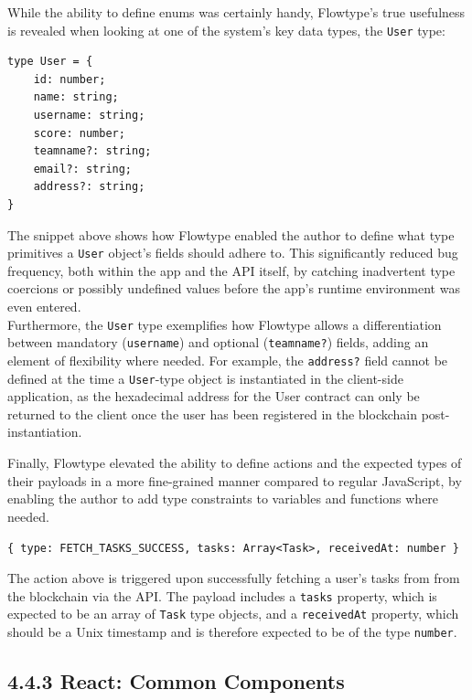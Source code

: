 While the ability to define enums was certainly handy, Flowtype's true
usefulness is revealed when looking at one of the system's key data
types, the \texttt{User} type:

\begin{verbatim}
type User = {
    id: number;
    name: string;
    username: string;
    score: number;
    teamname?: string;
    email?: string;
    address?: string;
}
\end{verbatim}

The snippet above shows how Flowtype enabled the author to define what
type primitives a \texttt{User} object's fields should adhere to. This
significantly reduced bug frequency, both within the app and the API
itself, by catching inadvertent type coercions or possibly undefined
values before the app's runtime environment was even entered.\\
Furthermore, the \texttt{User} type exemplifies how Flowtype allows a
differentiation between mandatory (\texttt{username}) and optional
(\texttt{teamname?}) fields, adding an element of flexibility where
needed. For example, the \texttt{address?} field cannot be defined at
the time a \texttt{User}-type object is instantiated in the client-side
application, as the hexadecimal address for the User contract can only
be returned to the client once the user has been registered in the
blockchain post-instantiation.

Finally, Flowtype elevated the ability to define actions and the
expected types of their payloads in a more fine-grained manner compared
to regular JavaScript, by enabling the author to add type constraints to
variables and functions where needed.

\texttt{\{\ type:\ \textquotesingle{}FETCH\_TASKS\_SUCCESS\textquotesingle{},\ tasks:\ Array\textless{}Task\textgreater{},\ receivedAt:\ number\ \}}

The action above is triggered upon successfully fetching a user's tasks
from from the blockchain via the API. The payload includes a
\texttt{tasks} property, which is expected to be an array of
\texttt{Task} type objects, and a \texttt{receivedAt} property, which
should be a Unix timestamp and is therefore expected to be of the type
\texttt{number}.

\subsection{4.4.3 React: Common
Components}\label{react-common-components}

